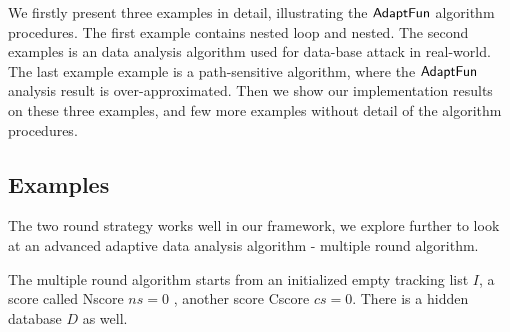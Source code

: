 %
We firstly present three examples in detail, illustrating the $\textsf{AdaptFun}$ algorithm procedures.
The first example contains nested loop and nested.
The second examples is an data analysis algorithm used for data-base attack in real-world.
The last example example is a path-sensitive algorithm, where the $\textsf{AdaptFun}$ analysis result is over-approximated. 
Then we show our implementation results on these three examples, and few more examples without detail of the  algorithm procedures.
%
\subsection{Examples}
%
\begin{example}
    \label{ex:multipleRounds}
%
The two round strategy works well in our framework, we explore further to look at an advanced adaptive data analysis algorithm - multiple round algorithm.
%
%
\end{example}
%
The multiple round algorithm starts from an initialized empty tracking list $I$, a score called Nscore $ns=0$ , another score Cscore $cs=0$.
There is a hidden database $D$ as well.
